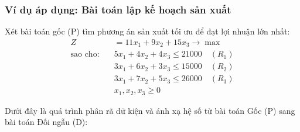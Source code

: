 \subsubsection*{Ví dụ áp dụng: Bài toán lập kế hoạch sản xuất}
Xét bài toán gốc (P) tìm phương án sản xuất tối ưu để đạt lợi nhuận lớn nhất:
\begin{align*}
    Z &= 11x_1 + 9x_2 + 15x_3 \rightarrow \max \\
\text{sao cho:} \quad
    &5x_1 + 4x_2 + 4x_3 \le 21000 \quad (R_1)\\
    &3x_1 + 6x_2 + 3x_3 \le 15000 \quad (R_2)\\
    &3x_1 + 7x_2 + 5x_3 \le 26000 \quad (R_3)\\
    &x_1, x_2, x_3 \ge 0
\end{align*}

Dưới đây là quá trình phân rã dữ kiện và ánh xạ hệ số từ bài toán Gốc (P) sang bài toán Đối ngẫu (D):

